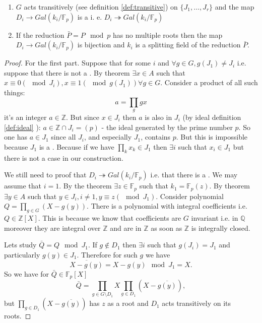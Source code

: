 \begin{theorem}
  \begin{enumerate}
  \item $G$ acts transitively (see definition \ref{def:transitive}) on
    $\{J_1, \dots, J_r\}$ and the map
    $D_i \to Gal\left(k_i/\mathbb{F}_p\right)$ is a
     i. e.
    $D_i \twoheadrightarrow Gal\left(k_i/\mathbb{F}_p\right)$
    \item If the reduction $\bar{P} = P \mod p$ has no multiple roots
      then the map $D_i \to Gal\left(k_i/\mathbb{F}_p\right)$ is
      bijection and $k_i$ is a splitting field of the reduction
      $\bar{P}$. 
  \end{enumerate}
  \begin{proof}
    For the first part. Suppose that for some $i$ and $\forall g \in G,
    g\left(J_1\right) \ne J_i$ i.e. suppose that there is not a
    . By 
    theorem $\exists x \in A$ such that
    $x \equiv 0 (\mod J_i),  x \equiv 1 (\mod g\left(J_1\right))
    \forall g \in G$. Consider a product of all such things:
    \[
    a = \prod_{g} g x
    \]
    it's an integer $a \in \mathbb{Z}$. But since $x \in J_i$ then $a$
    is also in $J_i$ (by ideal definition \ref{def:ideal} ):
    $a \in \mathbb{Z} \cap J_i = (p)$ - the ideal generated by the prime
    number $p$. So one has $a \in J_1$ since all $J_i$, and
    especially $J_1$, contains $p$. But this is impossible because
    $J_1$ is a . Because if we have
    $\prod_k x_k \in J_1$ then $\exists i$ such that $x_i \in J_1$ but
    there is not a case in our construction.

    We still need to proof that $D_i \twoheadrightarrow
    Gal\left(k_i/\mathbb{F}_p\right)$ i.e. that there is a
    . We may assume that $i=1$. By the
     theorem $\exists z \in
    \mathbb{F}_p$ such that $k_1 = \mathbb{F}_p\left(z\right)$. 
    By 
    theorem $\exists y \in A$ such that
    $y \in J_i, i \ne 1,  y \equiv z (\mod J_1)$. Consider polynomial
    $Q = \prod_{g \in G} \left(X - g\left(y\right)\right)$. There is a
    polynomial with integral coefficients i.e.
    $Q \in \mathbb{Z}\left[X\right]$. This is because we know that
    coefficients are $G$ invariant i.e. in $\mathbb{Q}$ moreover they
    are integral over $\mathbb{Z}$ and are in $\mathbb{Z}$ as soon as
    $\mathbb{Z}$ is integrally closed.

    Lets study $\bar{Q} = Q \mod J_1$. If $g \notin D_1$ then $\exists
    i$ such that $g\left(J_i\right) = J_1$ and particularly $g(y) \in
    J_1$. Therefore for such $g$ we have
    \[
    \overline{X -g\left(y\right)} = X -g\left(y\right) \mod J_1 = X. 
    \]
    So we have for $\bar{Q} \in \mathbb{F}_p\left[X\right]$
    \[
    \bar{Q} = \prod_{g \in G \setminus D_1} X \prod_{g \in D_1}
    \left(X - \overline{g\left(y\right)}\right),
    \]
    but
    \(
    \prod_{g \in D_1}
    \left(X - \overline{g\left(y\right)}\right)
    \) has $z$ as a root and $D_1$ acts transitively on its roots.


\end{proof}
\end{theorem}
